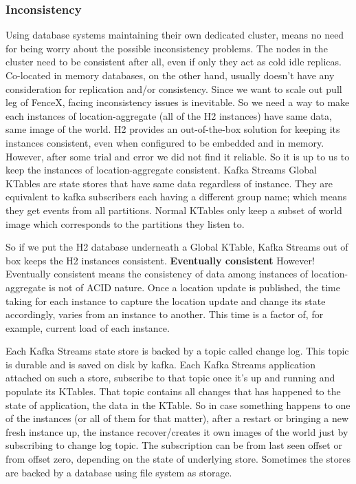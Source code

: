 \documentclass[a4]{report}
\begin{document}
    \subsubsection{Inconsistency}
    Using database systems maintaining their own dedicated cluster, means no need for being worry about the
    possible inconsistency problems.
    The nodes in the cluster need to be consistent after all, even if only they act as cold idle replicas.
    Co-located in memory databases, on the other hand, usually doesn't have any consideration for replication and/or
    consistency.
    Since we want to scale out pull leg of FenceX, facing inconsistency issues is inevitable.
    So we need a way to make each instances of location-aggregate (all of the H2 instances) have same data, same
    image of the world.
    H2 provides an out-of-the-box solution for keeping its instances consistent, even when configured to be embedded
    and in memory.
    However, after some trial and error we did not find it reliable.
    So it is up to us to keep the instances of location-aggregate consistent.
    Kafka Streams Global KTables are state stores that have same data regardless of instance.
    They are equivalent to kafka subscribers each having a different group name;
    which means they get events from all partitions.
    Normal KTables only keep a subset of world image which corresponds to the partitions they listen to.

    So if we put the H2 database underneath a Global KTable, Kafka Streams out of box keeps the H2 instances
    consistent.
    \textbf{Eventually consistent} However!
    Eventually consistent means the consistency of data among instances of location-aggregate is not of ACID nature.
    Once a location update is published, the time taking for each instance to capture the location update and change
    its state accordingly, varies from an instance to another.
    This time is a factor of, for example, current load of each instance.

    Each Kafka Streams state store is backed by a topic called change log.
    This topic is durable and is saved on disk by kafka.
    Each Kafka Streams application attached on such a store, subscribe to that topic once it's up and running and
    populate its KTables.
    That topic contains all changes that has happened to the state of application, the data in the KTable.
    So in case something happens to one of the instances (or all of them for that matter), after a restart or bringing
    a new fresh instance up, the instance recover/creates it own images of the world just by subscribing to change
    log topic.
    The subscription can be from last seen offset or from offset zero, depending on the state of underlying store.
    Sometimes the stores are backed by a database using file system as storage.
\end{document}
